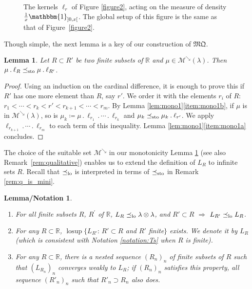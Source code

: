 \documentclass[JEP,XML,SOM,Unicode,NoEqCountersInSection,NoFloatCountersInSection,published]{cedram}
\newcommand{\ldot}{\mathbin{.}}
\newcommand{\lcdots}{\ldot\cdots\ldot}
\theoremstyle{plain}
\newtheorem{lemnotation}[them]{Lemma/Notation}
\newtheorem{lem}[them]{Lemma}
\theoremstyle{definition}
\newcommand{\mq}{\mathfrak{MQ}}
\newcommand{\one}{\mathbbm{1}}
\newcommand{\eqdef}{\coloneqq}
\newcommand{\la}{\lambda}
\newcommand{\R}{\mathbb{R}}
\newcommand{\lcsup}{\operatorname{losup}}
\newcommand{\leqs}{\preceq_{\text{\rm sto}}}
\newcommand{\mdec}{\mathcal{M}^{\scriptscriptstyle\searrow}}
\newcommand{\op}{\mathopen}
\newcommand{\clo}{\mathclose}
\newcommand{\leqlc}{\preceq_{\rm lo}}
\begin{document}
\begin{figure}[t]
\def\svgwidth{.7\textwidth}
\hspace*{\fill}\hspace*{\fill}\hspace*{\fill}\mbox{}\hspace*{\fill}\hspace*{\fill}
\caption{The kernels $\ell_r$ of Figure \ref{figure2}, acting on the measure of density $\frac1x\one_{\op]0,x\clo[}$. The global setup of this figure is the same as that of Figure~\ref{figure2}.}\label{figure3}
\end{figure}

Though simple, the next lemma is a key of our construction of $\mq$.
\begin{lem}\label{lem:mono2}
Let $R\subset R'$ be two finite subsets of\/ $\R$ and $\mu\in\mdec(\la)$. Then $\mu \ldot\ell_R\leqs \mu \ldot\ell_{R'}$.
\end{lem}
\begin{proof}
Using an induction on the cardinal difference, it is enough to prove this if $R'$ has one more element than $R$, say $r'$. We order it with the elements $r_i$ of $R$: $r_1<\cdots<r_k<r'<r_{k+1}<\cdots<r_m$. By Lemma \ref{lem:mono1}\eqref{item:mono1b}, if $\mu$ is in $\mdec(\la)$, so is $\mu_k\eqdef\mu\ldot\ell_{r_1}\lcdots \ell_{r_k}$ and $\mu_k\leqs \mu_k \ldot\ell_{r'}$. We apply $\ell_{r_{k+1}}\lcdots \ell_{r_m}$ to each term of this inequality. Lemma \ref{lem:mono1}\eqref{item:mono1a} concludes.
\end{proof}

\noindent The choice of the suitable set $\mdec$ in our monotonicity Lemma \ref{lem:mono2} (see also Remark~\ref{rem:qualitative}) enables us to extend the definition of $L_R$ to infinite sets $R$. Recall that $\leqlc$ is interpreted in terms of $\leqs$ in Remark \ref{rem:q_is_mini}.

\skpt
\begin{lemnotation}\label{lem:existenceT}
\begin{enumerate}
\item
\label{p1:lem:existenceT} For all finite subsets $R$, $R^{\prime}$ of\/ $\R$, $L_R\leqlc \la\otimes\la$, and $R'\subset R$ $\Rightarrow$ $L_{R'}\leqlc L_{R}$.

\item
\label{p2:def_L_R} For any $R\subset\R$, $\lcsup\{L_{R'}:\,R'\subset R$ and $R'$ finite$\}$ exists. We denote it by $L_R$ (which is consistent with Notation \ref{notation:Ts} when $R$ is finite). 

\item
\label{p3:def_L_R} For any $R\subset\R$, there is a nested sequence $(R_n)_n$ of finite subsets of $R$ such that $(L_{R_n})_n$ converges weakly to $L_R$; if $(R_n)_n$ satisfies this property, all sequence $(R'_n)_n$ such that $R'_n\supset R_n$ also does.
\end{enumerate}
\end{lemnotation}
\end{document}
